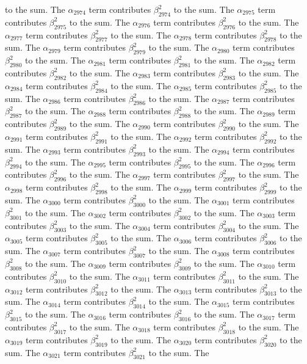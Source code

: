 \begin{lemma}
to the sum. The $\alpha_{2974}$ term contributes $\beta_{2974}^{2}$ to the sum. The $\alpha_{2975}$ term contributes $\beta_{2975}^{2}$ to the sum. The $\alpha_{2976}$ term contributes $\beta_{2976}^{2}$ to the sum. The $\alpha_{2977}$ term contributes $\beta_{2977}^{2}$ to the sum. The $\alpha_{2978}$ term contributes $\beta_{2978}^{2}$ to the sum. The $\alpha_{2979}$ term contributes $\beta_{2979}^{2}$ to the sum. The $\alpha_{2980}$ term contributes $\beta_{2980}^{2}$ to the sum. The $\alpha_{2981}$ term contributes $\beta_{2981}^{2}$ to the sum. The $\alpha_{2982}$ term contributes $\beta_{2982}^{2}$ to the sum. The $\alpha_{2983}$ term contributes $\beta_{2983}^{2}$ to the sum. The $\alpha_{2984}$ term contributes $\beta_{2984}^{2}$ to the sum. The $\alpha_{2985}$ term contributes $\beta_{2985}^{2}$ to the sum. The $\alpha_{2986}$ term contributes $\beta_{2986}^{2}$ to the sum. The $\alpha_{2987}$ term contributes $\beta_{2987}^{2}$ to the sum. The $\alpha_{2988}$ term contributes $\beta_{2988}^{2}$ to the sum. The $\alpha_{2989}$ term contributes $\beta_{2989}^{2}$ to the sum. The $\alpha_{2990}$ term contributes $\beta_{2990}^{2}$ to the sum. The $\alpha_{2991}$ term contributes $\beta_{2991}^{2}$ to the sum. The $\alpha_{2992}$ term contributes $\beta_{2992}^{2}$ to the sum. The $\alpha_{2993}$ term contributes $\beta_{2993}^{2}$ to the sum. The $\alpha_{2994}$ term contributes $\beta_{2994}^{2}$ to the sum. The $\alpha_{2995}$ term contributes $\beta_{2995}^{2}$ to the sum. The $\alpha_{2996}$ term contributes $\beta_{2996}^{2}$ to the sum. The $\alpha_{2997}$ term contributes $\beta_{2997}^{2}$ to the sum. The $\alpha_{2998}$ term contributes $\beta_{2998}^{2}$ to the sum. The $\alpha_{2999}$ term contributes $\beta_{2999}^{2}$ to the sum. The $\alpha_{3000}$ term contributes $\beta_{3000}^{2}$ to the sum. The $\alpha_{3001}$ term contributes $\beta_{3001}^{2}$ to the sum. The $\alpha_{3002}$ term contributes $\beta_{3002}^{2}$ to the sum. The $\alpha_{3003}$ term contributes $\beta_{3003}^{2}$ to the sum. The $\alpha_{3004}$ term contributes $\beta_{3004}^{2}$ to the sum. The $\alpha_{3005}$ term contributes $\beta_{3005}^{2}$ to the sum. The $\alpha_{3006}$ term contributes $\beta_{3006}^{2}$ to the sum. The $\alpha_{3007}$ term contributes $\beta_{3007}^{2}$ to the sum. The $\alpha_{3008}$ term contributes $\beta_{3008}^{2}$ to the sum. The $\alpha_{3009}$ term contributes $\beta_{3009}^{2}$ to the sum. The $\alpha_{3010}$ term contributes $\beta_{3010}^{2}$ to the sum. The $\alpha_{3011}$ term contributes $\beta_{3011}^{2}$ to the sum. The $\alpha_{3012}$ term contributes $\beta_{3012}^{2}$ to the sum. The $\alpha_{3013}$ term contributes $\beta_{3013}^{2}$ to the sum. The $\alpha_{3014}$ term contributes $\beta_{3014}^{2}$ to the sum. The $\alpha_{3015}$ term contributes $\beta_{3015}^{2}$ to the sum. The $\alpha_{3016}$ term contributes $\beta_{3016}^{2}$ to the sum. The $\alpha_{3017}$ term contributes $\beta_{3017}^{2}$ to the sum. The $\alpha_{3018}$ term contributes $\beta_{3018}^{2}$ to the sum. The $\alpha_{3019}$ term contributes $\beta_{3019}^{2}$ to the sum. The $\alpha_{3020}$ term contributes $\beta_{3020}^{2}$ to the sum. The $\alpha_{3021}$ term contributes $\beta_{3021}^{2}$ to the sum. The 
\end{lemma}
